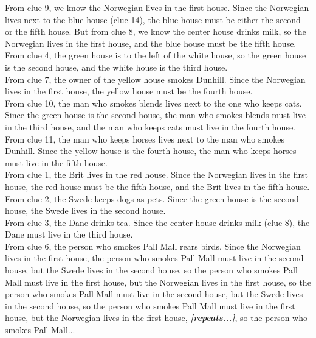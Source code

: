 \begin{tcolorbox}[breakable,boxrule=0.5pt,sharp corners,fontupper=\small,
colback=red!10, colframe=red!50!black, title={Failure: Infinite Repetition in Logic Puzzle Deductions}]
From clue 9, we know the Norwegian lives in the first house. Since the Norwegian lives next to the blue house (clue 14), the blue house must be either the second or the fifth house. But from clue 8, we know the center house drinks milk, so the Norwegian lives in the first house, and the blue house must be the fifth house.\\

From clue 4, the green house is to the left of the white house, so the green house is the second house, and the white house is the third house.\\

From clue 7, the owner of the yellow house smokes Dunhill. Since the Norwegian lives in the first house, the yellow house must be the fourth house.\\

From clue 10, the man who smokes blends lives next to the one who keeps cats. Since the green house is the second house, the man who smokes blends must live in the third house, and the man who keeps cats must live in the fourth house.\\

From clue 11, the man who keeps horses lives next to the man who smokes Dunhill. Since the yellow house is the fourth house, the man who keeps horses must live in the fifth house.\\

From clue 1, the Brit lives in the red house. Since the Norwegian lives in the first house, the red house must be the fifth house, and the Brit lives in the fifth house.\\

From clue 2, the Swede keeps dogs as pets. Since the green house is the second house, the Swede lives in the second house.\\

From clue 3, the Dane drinks tea. Since the center house drinks milk (clue 8), the Dane must live in the third house.\\

From clue 6, the person who smokes Pall Mall rears birds. Since the Norwegian lives in the first house, the person who smokes Pall Mall must live in the second house, but the Swede lives in the second house, so the person who smokes Pall Mall must live in the first house, but the Norwegian lives in the first house, so the person who smokes Pall Mall must live in the second house, but the Swede lives in the second house, so the person who smokes Pall Mall must live in the first house, but the Norwegian lives in the first house, \emph{\textbf{[repeats...]}}, so the person who smokes Pall Mall...
\end{tcolorbox}

